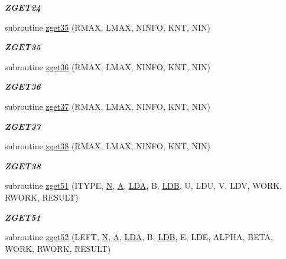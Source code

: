 \begin{DoxyCompactItemize}
\begin{DoxyCompactList}\small\item\em {\bfseries Z\+G\+E\+T24} \end{DoxyCompactList}\item 
subroutine \hyperlink{group__complex16__eig_ga06b79b13bd73f94f9dd9091c656edf38}{zget35} (R\+M\+A\+X, L\+M\+A\+X, N\+I\+N\+F\+O, K\+N\+T, N\+I\+N)
\begin{DoxyCompactList}\small\item\em {\bfseries Z\+G\+E\+T35} \end{DoxyCompactList}\item 
subroutine \hyperlink{group__complex16__eig_ga278000fdcd9e195f025572375e81eb60}{zget36} (R\+M\+A\+X, L\+M\+A\+X, N\+I\+N\+F\+O, K\+N\+T, N\+I\+N)
\begin{DoxyCompactList}\small\item\em {\bfseries Z\+G\+E\+T36} \end{DoxyCompactList}\item 
subroutine \hyperlink{group__complex16__eig_gaae18ead2df57b6911e5acdc209a39a76}{zget37} (R\+M\+A\+X, L\+M\+A\+X, N\+I\+N\+F\+O, K\+N\+T, N\+I\+N)
\begin{DoxyCompactList}\small\item\em {\bfseries Z\+G\+E\+T37} \end{DoxyCompactList}\item 
subroutine \hyperlink{group__complex16__eig_ga7e72d2c592f4188ce6e1f4c065edd682}{zget38} (R\+M\+A\+X, L\+M\+A\+X, N\+I\+N\+F\+O, K\+N\+T, N\+I\+N)
\begin{DoxyCompactList}\small\item\em {\bfseries Z\+G\+E\+T38} \end{DoxyCompactList}\item 
subroutine \hyperlink{group__complex16__eig_ga607a14c898294891e1205e5b20b011c8}{zget51} (I\+T\+Y\+P\+E, \hyperlink{polmisc_8c_a0240ac851181b84ac374872dc5434ee4}{N}, \hyperlink{classA}{A}, \hyperlink{example__user_8c_ae946da542ce0db94dced19b2ecefd1aa}{L\+D\+A}, B, \hyperlink{example__user_8c_a50e90a7104df172b5a89a06c47fcca04}{L\+D\+B}, U, L\+D\+U, V, L\+D\+V, W\+O\+R\+K, R\+W\+O\+R\+K, R\+E\+S\+U\+L\+T)
\begin{DoxyCompactList}\small\item\em {\bfseries Z\+G\+E\+T51} \end{DoxyCompactList}\item 
subroutine \hyperlink{group__complex16__eig_ga0e033c8f1d94f2f9dcf5742d6c93d85b}{zget52} (L\+E\+F\+T, \hyperlink{polmisc_8c_a0240ac851181b84ac374872dc5434ee4}{N}, \hyperlink{classA}{A}, \hyperlink{example__user_8c_ae946da542ce0db94dced19b2ecefd1aa}{L\+D\+A}, B, \hyperlink{example__user_8c_a50e90a7104df172b5a89a06c47fcca04}{L\+D\+B}, E, L\+D\+E, A\+L\+P\+H\+A, B\+E\+T\+A, W\+O\+R\+K, R\+W\+O\+R\+K, R\+E\+S\+U\+L\+T)

\end{DoxyCompactItemize}
